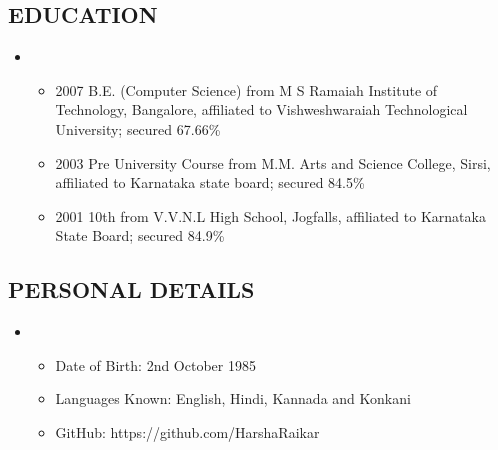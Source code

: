\documentclass[]{article}
\begin{document}
\subsection{EDUCATION}\label{education}

\begin{itemize}
\item
  \begin{itemize}
  \itemsep1pt\parskip0pt
  \item
    2007 B.E. (Computer Science) from M S Ramaiah Institute of
    Technology, Bangalore, affiliated to Vishweshwaraiah Technological
    University; secured 67.66\%
  \item
    2003 Pre University Course from M.M. Arts and Science College,
    Sirsi, affiliated to Karnataka state board; secured 84.5\%
  \item
    2001 10th from V.V.N.L High School, Jogfalls, affiliated to
    Karnataka State Board; secured 84.9\%
  \end{itemize}
\end{itemize}

\subsection{PERSONAL DETAILS}\label{personal-details}

\begin{itemize}
\item
  \begin{itemize}
  \itemsep1pt\parskip0pt
  \item
    Date of Birth: 2nd October 1985
  \item
    Languages Known: English, Hindi, Kannada and Konkani
  \item
    GitHub: https://github.com/HarshaRaikar
  \end{itemize}
\end{itemize}
\end{document}
